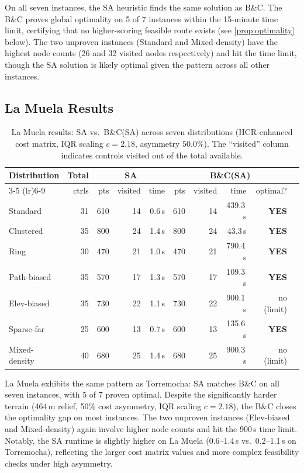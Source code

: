 \documentclass[11pt,a4paper]{article}
\begin{document}
On all seven instances, the SA heuristic finds the same solution as B\&C.
The B\&C proves global optimality on 5 of 7 instances within the 15-minute time limit, certifying that no higher-scoring feasible route exists (see \cref{prop:optimality} below).
The two unproven instances (Standard and Mixed-density) have the highest node counts (26 and 32 visited nodes respectively) and hit the time limit, though the SA solution is likely optimal given the pattern across all other instances.

\subsection{La Muela Results}

\begin{table}[H]
\centering
\caption{La Muela results: SA vs.\ B\&C(SA) across seven distributions (HCR-enhanced cost matrix, IQR scaling $c = 2.18$, asymmetry $50.0\%$). The ``visited'' column indicates controls visited out of the total available.}
\label{tab:lamuela}
\begin{tabular}{lrrrrrrrrc}
\toprule
\textbf{Distribution} & \textbf{Total} & \multicolumn{3}{c}{\textbf{SA}} & \multicolumn{4}{c}{\textbf{B\&C(SA)}} \\
\cmidrule(lr){3-5} \cmidrule(lr){6-9}
& ctrls & pts & visited & time & pts & visited & time & optimal? \\
\midrule
Standard        & 31 &  610 & 14 & 0.6\,s &  610 & 14 & 439.3\,s & \textbf{YES} \\
Clustered       & 35 &  800 & 24 & 1.4\,s &  800 & 24 &  43.3\,s & \textbf{YES} \\
Ring            & 30 &  470 & 21 & 1.0\,s &  470 & 21 & 790.4\,s & \textbf{YES} \\
Path-biased     & 35 &  570 & 17 & 1.3\,s &  570 & 17 & 109.3\,s & \textbf{YES} \\
Elev-biased     & 35 &  730 & 22 & 1.1\,s &  730 & 22 & 900.1\,s & no (limit) \\
Sparse-far      & 25 &  600 & 13 & 0.7\,s &  600 & 13 & 135.6\,s & \textbf{YES} \\
Mixed-density   & 40 &  680 & 25 & 1.4\,s &  680 & 25 & 900.3\,s & no (limit) \\
\bottomrule
\end{tabular}
\end{table}

La Muela exhibits the same pattern as Torremocha: SA matches B\&C on all seven instances, with 5 of 7 proven optimal.
Despite the significantly harder terrain (464\,m relief, 50\% cost asymmetry, IQR scaling $c = 2.18$), the B\&C closes the optimality gap on most instances.
The two unproven instances (Elev-biased and Mixed-density) again involve higher node counts and hit the 900\,s time limit.
Notably, the SA runtime is slightly higher on La Muela (0.6--1.4\,s vs.\ 0.2--1.1\,s on Torremocha), reflecting the larger cost matrix values and more complex feasibility checks under high asymmetry.
\end{document}
